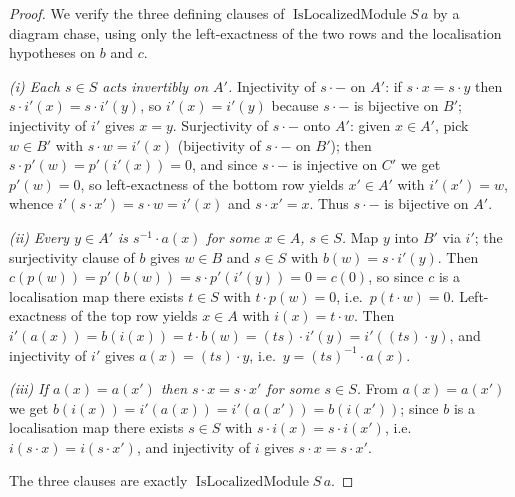 \begin{proof}

\leanok
  We verify the three defining clauses of \(\operatorname{IsLocalizedModule} S\, a\) by a diagram chase,
  using only the left-exactness of the two rows and the localisation hypotheses on \(b\) and \(c\).

  \emph{(i) Each \(s \in S\) acts invertibly on \(A'\).} Injectivity of \(s \cdot -\) on \(A'\): if
  \(s \cdot x = s \cdot y\) then \(s \cdot i'(x) = s \cdot i'(y)\), so \(i'(x) = i'(y)\) because
  \(s \cdot -\) is bijective on \(B'\); injectivity of
  \(i'\) gives \(x = y\). Surjectivity of \(s \cdot -\) onto \(A'\): given \(x \in A'\), pick
  \(w \in B'\) with \(s \cdot w = i'(x)\) (bijectivity of \(s \cdot -\) on \(B'\)); then
  \(s \cdot p'(w) = p'(i'(x)) = 0\), and since \(s \cdot -\) is injective on \(C'\) we get \(p'(w) = 0\),
  so left-exactness of the bottom row yields \(x' \in A'\) with \(i'(x') = w\), whence
  \(i'(s \cdot x') = s \cdot w = i'(x)\) and \(s \cdot x' = x\). Thus \(s \cdot -\) is bijective on \(A'\).

  \emph{(ii) Every \(y \in A'\) is \(s^{-1} \cdot a(x)\) for some \(x \in A\), \(s \in S\).} Map \(y\) into
  \(B'\) via \(i'\); the surjectivity clause of \(b\) gives \(w \in B\) and \(s \in S\) with
  \(b(w) = s \cdot i'(y)\). Then \(c(p(w)) = p'(b(w)) = s \cdot p'(i'(y)) = 0 = c(0)\), so since
  \(c\) is a localisation map there exists \(t \in S\) with \(t \cdot p(w) = 0\), i.e.\
  \(p(t \cdot w) = 0\). Left-exactness of the top row yields \(x \in A\) with \(i(x) = t \cdot w\). Then
  \(i'(a(x)) = b(i(x)) = t \cdot b(w) = (t s) \cdot i'(y) = i'((t s) \cdot y)\), and injectivity of \(i'\)
  gives \(a(x) = (t s) \cdot y\), i.e.\ \(y = (ts)^{-1} \cdot a(x)\).

  \emph{(iii) If \(a(x) = a(x')\) then \(s \cdot x = s \cdot x'\) for some \(s \in S\).} From
  \(a(x) = a(x')\) we get \(b(i(x)) = i'(a(x)) = i'(a(x')) = b(i(x'))\); since \(b\) is a
  localisation map there exists \(s \in S\) with \(s \cdot i(x) = s \cdot i(x')\),
  i.e.\ \(i(s \cdot x) = i(s \cdot x')\), and injectivity of \(i\) gives \(s \cdot x = s \cdot x'\).

  The three clauses are exactly \(\operatorname{IsLocalizedModule} S\, a\).
\end{proof}

